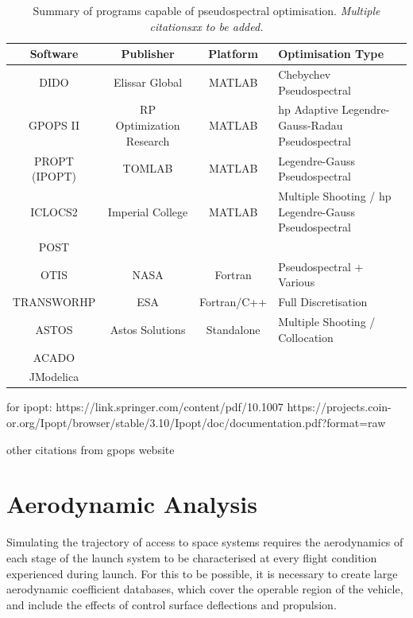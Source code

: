 \begin{table}[!ht]
	
	\begin{tabular}{|c|c|c| p{7cm}|}
		\hline \textbf{Software} & \textbf{Publisher} & \textbf{Platform} & \textbf{Optimisation Type} \\ 
		\hline DIDO\cite{Ross2002} & Elissar Global & MATLAB & Chebychev Pseudospectral \\ 
		\hline GPOPS II\cite{Rao2010} & RP Optimization Research & MATLAB & hp Adaptive Legendre-Gauss-Radau Pseudospectral \\ 
		\hline PROPT (IPOPT) & TOMLAB & MATLAB & Legendre-Gauss  Pseudospectral  \\ 
		\hline ICLOCS2 & Imperial College & MATLAB &  Multiple Shooting / hp Legendre-Gauss Pseudospectral  \\ 
		\hline POST &  &  &  \\ 
		\hline OTIS & NASA  & Fortran & Pseudospectral + Various  \\ 
		\hline TRANSWORHP\cite{Wassel2013} & ESA & Fortran/C++ & Full Discretisation \\ 
		\hline ASTOS & Astos Solutions & Standalone & Multiple Shooting / Collocation  \\  
		\hline ACADO &  &  &   \\  
		\hline JModelica &  &  &   \\  
		
		\hline 
	\end{tabular} 
	
	\caption{Summary of programs capable of pseudospectral optimisation. \textit{Multiple citationsxx to be added.}}
	\label{table:programs}
\end{table}








for ipopt:
https://link.springer.com/content/pdf/10.1007%
https://projects.coin-or.org/Ipopt/browser/stable/3.10/Ipopt/doc/documentation.pdf?format=raw

other citations from gpops website




\section{Aerodynamic Analysis}


Simulating the trajectory of access to space systems requires the aerodynamics of each stage of the launch system to be characterised at every flight condition experienced during launch. For this to be possible, it is necessary to create large aerodynamic coefficient databases, which cover the operable region of the vehicle, and include the effects of control surface deflections and propulsion.

